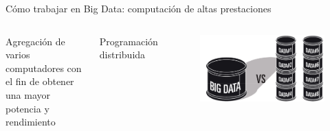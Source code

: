 		\begin{frame}{\large Cómo trabajar en Big Data: computación de altas prestaciones}
			
			
			\begin{columns}
				\fontsize{8.5}{8}\selectfont

				\begin{tcolorbox}[colback=ChetwodeBlue!10,colframe=ChetwodeBlue!60]
					Agregación de varios computadores con el fin de obtener una mayor potencia y rendimiento
				\end{tcolorbox}
				{\begin{center}\large\color{ChetwodeBlue}Programación distribuida\end{center}}
				\kern-5mm
				\begin{figure}
					\includegraphics[width=\textwidth]{./Images/bloques.png}
				\end{figure}


\end{columns}
\end{frame}
